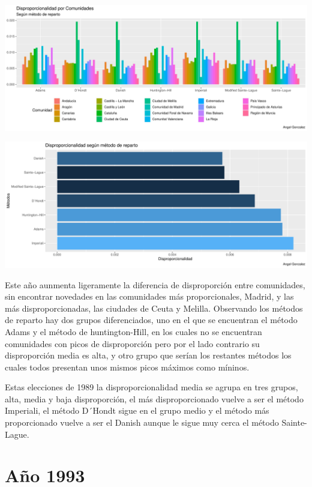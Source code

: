 \documentclass[12pt,a4paper,]{book}
\numberwithin{dummy}{section}
\theoremstyle{ocrenumbox}
\theoremstyle{blacknumex}
\theoremstyle{blacknumbox}
\theoremstyle{ocrenum}
\theoremstyle{ocrenum}
\begin{document}
\begin{center}\includegraphics[width=0.95\linewidth]{figurasR/unnamed-chunk-96-1} \end{center}

\begin{center}\includegraphics[width=0.95\linewidth]{figurasR/unnamed-chunk-96-2} \end{center}

Este año aunmenta ligeramente la diferencia de disproporción entre
comunidades, sin encontrar novedades en las comunidades más
proporcionales, Madrid, y las más disproporcionadas, las ciudades de
Ceuta y Melilla. Observando los métodos de reparto hay dos grupos
diferenciados, uno en el que se encuentran el método Adams y el método
de huntington-Hill, en los cuales no se encuentran comunidades con picos
de disproporción pero por el lado contrario su disproporción media es
alta, y otro grupo que serían los restantes métodos los cuales todos
presentan unos mismos picos máximos como míninos.

Estas elecciones de 1989 la disproporcionalidad media se agrupa en tres
grupos, alta, media y baja disproporción, el más disproporcionado vuelve
a ser el método Imperiali, el método D´Hondt sigue en el grupo medio y
el método más proporcionado vuelve a ser el Danish aunque le sigue muy
cerca el método Sainte-Lague.

\hypertarget{auxf1o-1993}{%
\section{Año 1993}\label{auxf1o-1993}}
\end{document}
